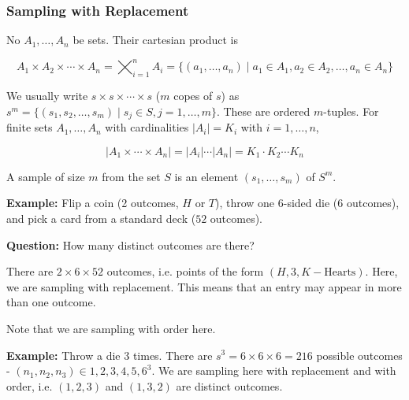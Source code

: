 \documentclass[12pt]{article}
\begin{document}
\subsubsection*{Sampling with Replacement}
\noindent
No $A_1, \ldots, A_n$ be sets. Their cartesian product is 

\begin{equation*}
A_1 \times A_2 \times \cdots \times A_n = \varprod_{i=1}^n A_i = \big \{ (a_1, \ldots, a_n) \mid a_1 \in A_1, a_2 \in A_2, \ldots, a_n \in A_n \big \}
\end{equation*}

\noindent
We usually write $s \times s \times \cdots \times s$ ($m$ copes of $s$) as $s^m = \big \{ (s_1, s_2, \ldots, s_m) \mid s_j \in S, j = 1, \ldots, m \big \}$. These are ordered $m$-tuples. For finite sets $A_1, \ldots, A_n$ with cardinalities $\mid A_i \mid = K_i$ with $i = 1, \ldots, n$,

\begin{equation*}
\lvert A_1 \times \cdots \times A_n \rvert = \lvert A_i \rvert \cdots \lvert A_n \rvert = K_1 \cdot K_2 \cdots K_n
\end{equation*} 

\noindent
A sample of size $m$ from the set $S$ is an element $(s_1, \ldots, s_m)$ of $S^m$.

\begin{tcolorbox}
\textbf{Example:} Flip a coin (2 outcomes, $H$ or $T$), throw one $6$-sided die ($6$ outcomes), and pick a card from a standard deck ($52$ outcomes). 

\begin{adjustwidth}{2.5em}{0pt}
\textbf{Question:} How many distinct outcomes are there?

There are $2 \times 6 \times 52$ outcomes, i.e. points of the form $(H, 3, K-\text{Hearts})$. Here, we are sampling with replacement. This means that an entry may appear in more than one outcome.
\end{adjustwidth}

\noindent
Note that we are sampling with order here.
\end{tcolorbox}

\begin{tcolorbox}
\textbf{Example:} Throw a die $3$ times. There are $s^3=6 \times 6 \times 6 = 216$ possible outcomes - $(n_1, n_2, n_3) \in {1, 2, 3, 4, 5, 6}^3$. We are sampling here with replacement and with order, i.e. $(1,2,3)$ and $(1,3,2)$ are distinct outcomes. 
\end{tcolorbox}
\end{document}
